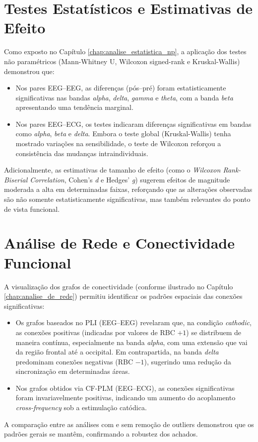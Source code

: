 \section{Testes Estatísticos e Estimativas de Efeito}
Como exposto no Capítulo \ref{chap:analise_estatistica_np}, a aplicação dos testes não paramétricos (Mann-Whitney U, Wilcoxon signed-rank e Kruskal-Wallis) demonstrou que:
\begin{itemize}
    \item Nos pares EEG--EEG, as diferenças (pós--pré) foram estatisticamente significativas nas bandas \emph{alpha}, \emph{delta}, \emph{gamma} e \emph{theta}, com a banda \emph{beta} apresentando uma tendência marginal.
    \item Nos pares EEG--ECG, os testes indicaram diferenças significativas em bandas como \emph{alpha}, \emph{beta} e \emph{delta}. Embora o teste global (Kruskal-Wallis) tenha mostrado variações na sensibilidade, o teste de Wilcoxon reforçou a consistência das mudanças intraindividuais.
\end{itemize}
Adicionalmente, as estimativas de tamanho de efeito (como o \emph{Wilcoxon Rank-Biserial Correlation}, Cohen's \emph{d} e Hedges' \emph{g}) sugerem efeitos de magnitude moderada a alta em determinadas faixas, reforçando que as alterações observadas são não somente estatisticamente significativas, mas também relevantes do ponto de vista funcional.

\section{Análise de Rede e Conectividade Funcional}
A visualização dos grafos de conectividade (conforme ilustrado no Capítulo \ref{chap:analise_de_rede}) permitiu identificar os padrões espaciais das conexões significativas:
\begin{itemize}
    \item Os grafos baseados no PLI (EEG--EEG) revelaram que, na condição \emph{cathodic}, as conexões positivas (indicadas por valores de RBC $+1$) se distribuem de maneira contínua, especialmente na banda \emph{alpha}, com uma extensão que vai da região frontal até a occipital. Em contrapartida, na banda \emph{delta} predominam conexões negativas (RBC $-1$), sugerindo uma redução da sincronização em determinadas áreas.
    \item Nos grafos obtidos via CF-PLM (EEG--ECG), as conexões significativas foram invariavelmente positivas, indicando um aumento do acoplamento \emph{cross-frequency} sob a estimulação catódica.
\end{itemize}
A comparação entre as análises com e sem remoção de outliers demonstrou que os padrões gerais se mantêm, confirmando a robustez dos achados.

